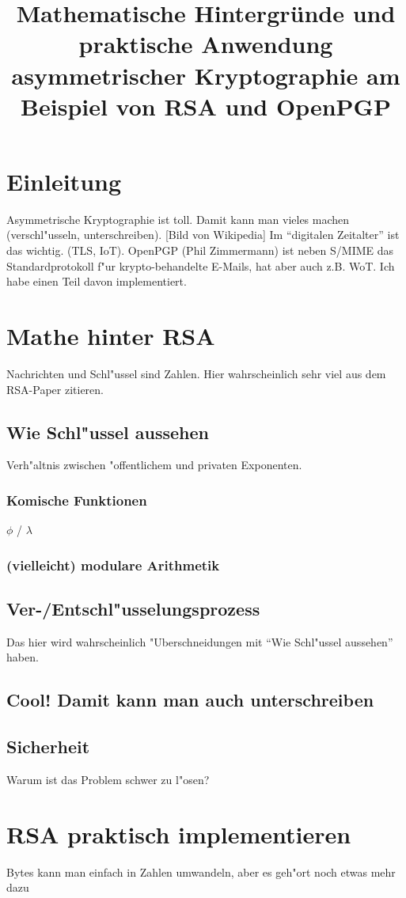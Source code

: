 \documentclass[12pt]{article}
\title{Mathematische Hintergr\"unde und praktische Anwendung asymmetrischer Kryptographie am Beispiel von RSA und OpenPGP}
\begin{document}
\maketitle
\thispagestyle{empty}
\newpage
\tableofcontents
\newpage

\section{Einleitung}
Asymmetrische Kryptographie ist toll. Damit kann man vieles machen (verschl"usseln, unterschreiben). [Bild von Wikipedia] Im "`digitalen Zeitalter"' ist das wichtig. (TLS, IoT). OpenPGP (Phil Zimmermann) ist neben S/MIME das Standardprotokoll f"ur krypto-behandelte E-Mails, hat aber auch z.B. WoT. Ich habe einen Teil davon implementiert.

\section{Mathe hinter RSA}
Nachrichten und Schl"ussel sind Zahlen.
Hier wahrscheinlich sehr viel aus dem RSA-Paper zitieren.
\subsection{Wie Schl"ussel aussehen}
Verh"altnis zwischen "offentlichem und privaten Exponenten.
\subsubsection{Komische Funktionen}
$\phi$ / $\lambda$
\subsubsection{(vielleicht) modulare Arithmetik}
\subsection{Ver-/Entschl"usselungsprozess}
Das hier wird wahrscheinlich "Uberschneidungen mit "`Wie Schl"ussel aussehen"' haben.
\subsection{Cool! Damit kann man auch unterschreiben}
\subsection{Sicherheit}
Warum ist das Problem schwer zu l"osen?

\section{RSA praktisch implementieren}
Bytes kann man einfach in Zahlen umwandeln, aber es geh"ort noch etwas mehr dazu
\end{document}

